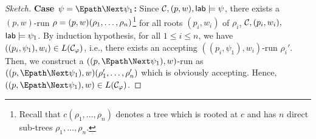 \documentclass{llncs}
\newcommand{\inductioncase}[1]{\noindent\textbf{#1}}
\let\phi\varphi
\begin{document}
{{\begin{proof}[Sketch]
\inductioncase{Case $\psi = \Epath\Next\psi_1$:}
Since $\mathcal{C},(p,w),\mathsf{lab} \models \psi$, there exists a $(p,w)$-run $\rho = (p,w)(\rho_1,\ldots,\linebreak\rho_n)$\footnote{Recall
that $c(\rho_1,\ldots,\rho_n)$ denotes a tree which is rooted at $c$ and has $n$ direct sub-trees $\rho_1,\ldots,\rho_n$.}
for all roots $(p_i,w_i)$ of $\rho_i$,  
$\mathcal{C},(p_i,w_i),$ $\mathsf{lab} \models \psi_1$.
By induction hypothesis, for all $1 \leq i \leq n$, we have $((p_i,\psi_1),w_i) \in L(\CABPDS_{\phi})$, i.e.,
there exists an accepting $((p_i,\psi_1),w_i)$-run $\rho_i'$.
Then, we construct a $((p,\Epath\Next\psi_1),w)$-run as $((p,\Epath\Next\psi_1),w)(\rho_1',\linebreak\ldots,\rho_n')$ which
is obviously accepting. Hence, $((p,\Epath\Next\psi_1),w)\in L(\CABPDS_\varphi)$.


\end{proof}}}
\end{document}
